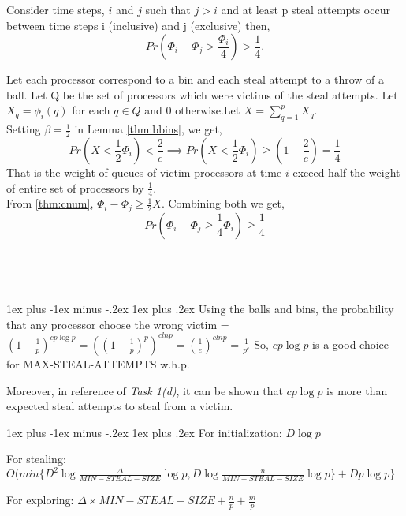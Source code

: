 \documentclass[11pt]{article}
\makeatletter
\renewcommand{\subsection}{\@startsection{subsection}{2}{0mm}%
                                     {1ex plus -1ex minus -.2ex}%
                                     {1ex plus .2ex}%
                                     {\normalfont\large\bfseries}}%
\makeatother
\begin{document}
Consider time steps, $i$ and $j$ such that $j > i$ and at least p steal attempts occur between time steps i (inclusive) and j (exclusive) then,
\[
    Pr \left( \Phi_i - \Phi_j > \frac{\Phi_i}{4}\right)  > \frac {1}{4}.
\]
\label{thm:phases}


Let each processor correspond to a bin and each steal attempt to a throw of a ball. Let Q be the set of processors which were victims of the steal attempts. Let $X_q = \phi_i(q)$ for each $q \in Q$ and $0$ otherwise.Let  $X = \sum \limits_{q=1}^p X_q$.\\
Setting $\beta = \frac {1}{2}$ in Lemma \ref{thm:bbins}, we get,
\[
Pr \left( X < \frac{1}{2} \Phi_i \right) < \frac {2}{e} \implies Pr \left( X < \frac{1}{2} \Phi_i \right) \ge \left( 1 - \frac {2}{e} \right) = \frac {1}{4}
\]
That is the weight of queues of victim processors at time $i$ exceed half the weight of entire set of processors by $\frac {1}{4}$.\\
From \ref{thm:cnum}, $\Phi_i - \Phi_j \ge \frac{1}{2} X$. Combining both we get,
\[
Pr \left( \Phi_i - \Phi_j \ge \frac {1}{4} \Phi_i \right) \ge  \frac {1}{4}
\]\\\\\\\\





\subsection{}
Using the balls and bins, the probability that any processor choose the wrong victim = ${(1-\frac{1}{p})}^{cp \log p} = {({(1-\frac{1}{p})}^p)}^{clnp} = {(\frac{1}{e})}^{clnp} = \frac{1}{p^c}$
So, $cp\log p$ is a good choice for MAX-STEAL-ATTEMPTS w.h.p. 

Moreover, in reference of {\it Task 1(d)}, it can be shown that  $cp \log p$ is more than expected steal attempts to steal from a victim.

\subsection{}
For initialization: $D \log p$

For stealing: $O(min \{ D^2 \log \frac {\Delta}{MIN-STEAL-SIZE} \log p, D \log \frac {n}{MIN-STEAL-SIZE} \log p \} + D p \log p \}$

For exploring: $\Delta \times MIN-STEAL-SIZE + \frac{n}{p} + \frac{m}{p}$
\end{document}
